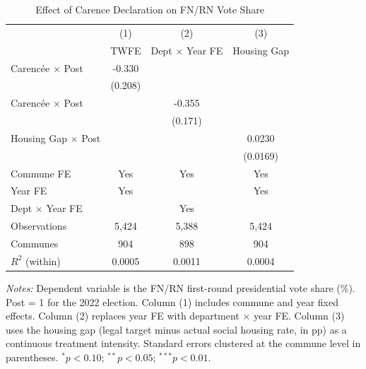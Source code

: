 \begin{table}[t]
\centering
\caption{Effect of Carence Declaration on FN/RN Vote Share}
\label{tab:main}
\small
\begin{tabular}{lccc}
\toprule
 & (1) & (2) & (3) \\
 & TWFE & Dept $\times$ Year FE & Housing Gap \\
\midrule
Carenc\'{e}e $\times$ Post & -0.330 & & \\
 & (0.208) & & \\
Carenc\'{e}e $\times$ Post & & -0.355 & \\
 & & (0.171) & \\
Housing Gap $\times$ Post & & & 0.0230 \\
 & & & (0.0169) \\
\midrule
Commune FE & Yes & Yes & Yes \\
Year FE & Yes & & Yes \\
Dept $\times$ Year FE & & Yes & \\
Observations & 5,424 & 5,388 & 5,424 \\
Communes & 904 & 898 & 904 \\
$R^2$ (within) & 0.0005 & 0.0011 & 0.0004 \\
\bottomrule
\end{tabular}
\begin{tablenotes}
\item \textit{Notes:} Dependent variable is the FN/RN first-round presidential vote share (\%). Post = 1 for the 2022 election. Column (1) includes commune and year fixed effects. Column (2) replaces year FE with department $\times$ year FE. Column (3) uses the housing gap (legal target minus actual social housing rate, in pp) as a continuous treatment intensity. Standard errors clustered at the commune level in parentheses. $^{*}p<0.10$; $^{**}p<0.05$; $^{***}p<0.01$.
\end{tablenotes}
\end{table}
